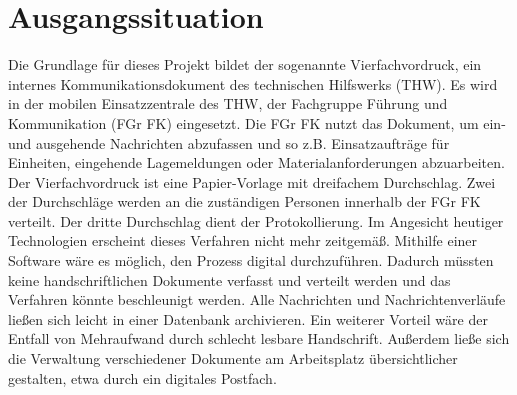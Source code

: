 \section{Ausgangssituation}
Die Grundlage für dieses Projekt bildet der sogenannte Vierfachvordruck, ein 
internes Kommunikationsdokument des technischen Hilfswerks (THW). Es wird in 
der mobilen Einsatzzentrale des THW, der Fachgruppe Führung und Kommunikation 
(FGr FK) eingesetzt. Die FGr FK nutzt das Dokument, um ein- und ausgehende 
Nachrichten abzufassen und so z.B. Einsatzaufträge für Einheiten, eingehende 
Lagemeldungen oder Materialanforderungen abzuarbeiten. Der Vierfachvordruck 
ist eine Papier-Vorlage mit dreifachem Durchschlag. Zwei der Durchschläge 
werden an die zuständigen Personen innerhalb der FGr FK verteilt. Der dritte 
Durchschlag dient der Protokollierung. Im Angesicht heutiger Technologien 
erscheint dieses Verfahren nicht mehr zeitgemäß. Mithilfe einer Software wäre 
es möglich, den Prozess digital durchzuführen. Dadurch müssten keine 
handschriftlichen Dokumente verfasst und verteilt werden und das Verfahren 
könnte beschleunigt werden. Alle Nachrichten und Nachrichtenverläufe ließen 
sich leicht in einer Datenbank archivieren. Ein weiterer Vorteil wäre der 
Entfall von Mehraufwand durch schlecht lesbare Handschrift. Außerdem ließe 
sich die Verwaltung verschiedener Dokumente am Arbeitsplatz übersichtlicher 
gestalten, etwa durch ein digitales Postfach.